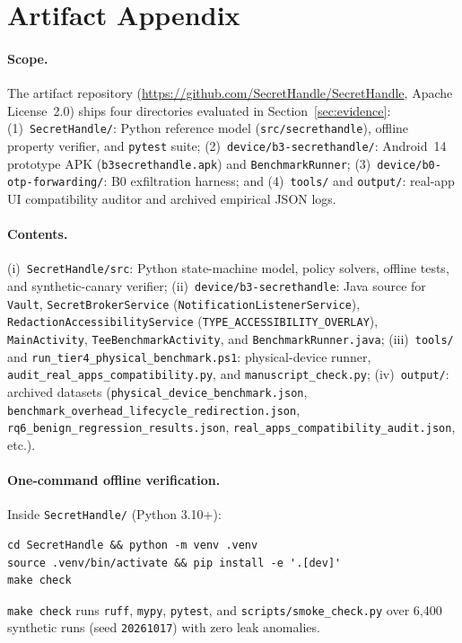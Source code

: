 \section{Artifact Appendix}
\label{sec:artifact}

\paragraph{Scope.} The \SH{} artifact repository (\url{https://github.com/SecretHandle/SecretHandle}, Apache License~2.0) ships four directories evaluated in Section~\ref{sec:evidence}: (1)~\texttt{SecretHandle/}: Python reference model (\texttt{src/secrethandle}), offline property verifier, and \texttt{pytest} suite; (2)~\texttt{device/\allowbreak b3-secrethandle/}: Android~14 prototype APK (\texttt{b3secrethandle.apk}) and \texttt{BenchmarkRunner}; (3)~\texttt{device/\allowbreak b0-otp-forwarding/}: B0 exfiltration harness; and (4)~\texttt{tools/} and \texttt{output/}: real-app UI compatibility auditor and archived empirical JSON logs.

\paragraph{Contents.}
(i)~\texttt{SecretHandle/src}: Python state-machine model, policy solvers, offline tests, and synthetic-canary verifier;
(ii)~\texttt{device/\allowbreak b3-\allowbreak secrethandle}: Java source for \texttt{Vault}, \texttt{Secret\allowbreak Broker\allowbreak Service} (\texttt{Notification\allowbreak Listener\allowbreak Service}), \texttt{Redaction\allowbreak Accessibility\allowbreak Service} (\texttt{TYPE\_\allowbreak ACCESSIBILITY\_\allowbreak OVERLAY}), \texttt{MainActivity}, \texttt{Tee\allowbreak Benchmark\allowbreak Activity}, and \texttt{Benchmark\allowbreak Runner.java};
(iii)~\texttt{tools/} and \texttt{run\_\allowbreak tier4\_\allowbreak physical\_\allowbreak benchmark.ps1}: physical-device runner, \texttt{audit\_\allowbreak real\_\allowbreak apps\_\allowbreak compatibility.py}, and \texttt{manuscript\_\allowbreak check.py};
(iv)~\texttt{output/}: archived datasets (\texttt{physical\_\allowbreak device\_\allowbreak benchmark.json}, \texttt{benchmark\_\allowbreak overhead\_\allowbreak lifecycle\_\allowbreak redirection.json}, \texttt{rq6\_\allowbreak benign\_\allowbreak regression\_\allowbreak results.json}, \texttt{real\_\allowbreak apps\_\allowbreak compatibility\_\allowbreak audit.json}, etc.).

\paragraph{One-command offline verification.} Inside \texttt{SecretHandle/} (Python 3.10+):
\begin{small}
\begin{verbatim}
cd SecretHandle && python -m venv .venv
source .venv/bin/activate && pip install -e '.[dev]'
make check
\end{verbatim}
\end{small}
\texttt{make check} runs \texttt{ruff}, \texttt{mypy}, \texttt{pytest}, and \texttt{scripts/\allowbreak smoke\_\allowbreak check.py} over 6,400 synthetic runs (seed \texttt{20261017}) with zero leak anomalies.

